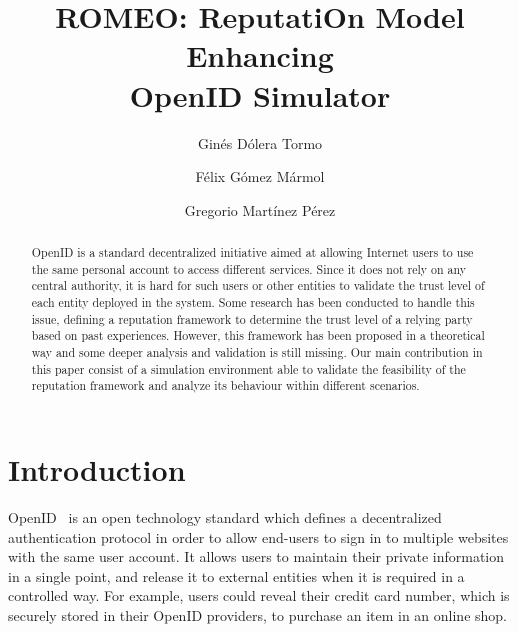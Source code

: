 \documentclass{llncs}
\begin{document}
\title{ROMEO: ReputatiOn Model Enhancing \\OpenID Simulator}

\author{Gin\'es D\'olera Tormo \and F\'elix G\'omez M\'armol \and Gregorio Mart\'inez P\'erez}

\maketitle

\begin{abstract}

OpenID is a standard decentralized initiative aimed at allowing Internet users to use the same personal account to access different services. Since it does not rely on any central authority, it is hard for such users or other entities to validate the trust level of each entity deployed in the system. Some research has been conducted to handle this issue, defining a reputation framework to determine the trust level of a relying party based on past experiences. However, this framework has been proposed in a theoretical way and some deeper analysis and validation is still missing. Our main contribution in this paper consist of a simulation environment able to validate the feasibility of the reputation framework and analyze its behaviour within different scenarios.

\end{abstract}


\section{Introduction}

OpenID~\cite{idm:2006:recordon:2006:dim} is an open technology standard which defines a decentralized authentication protocol in order to allow end-users to sign in to multiple websites with the same user account. It allows users to maintain their private information in a single point, and release it to external entities when it is required in a controlled way. For example, users could reveal their credit card number, which is securely stored in their OpenID providers, to purchase an item in an online shop.
\end{document}
